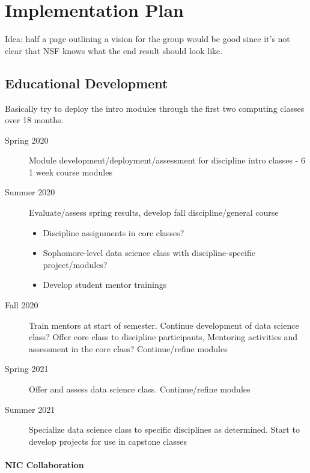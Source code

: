 \section{Implementation Plan}
Idea: half a page outlining a vision for the group would be good since it's not clear that NSF knows what the end result should look like.

\subsection{Educational Development}
Basically try to deploy the intro modules through the first two computing classes over 18 months.
\begin{description}
    \item[Spring 2020] Module development/deployment/assessment for discipline intro classes - 6 1 week course modules
    \item[Summer 2020] Evaluate/assess spring results, develop fall discipline/general course
    \begin{itemize}
        \item Discipline assignments in core classes?
        \item Sophomore-level data science class with discipline-specific project/modules?
        \item Develop student mentor trainings
    \end{itemize}
    \item[Fall 2020] Train mentors at start of semester. Continue development of data science class? Offer core class to discipline participants, Mentoring activities and assessment in the core class? Continue/refine modules
    \item[Spring 2021] Offer and assess data science class. Continue/refine modules
    \item[Summer 2021] Specialize data science class to specific disciplines as determined. Start to develop projects for use in capstone classes
\end{description}

\paragraph{NIC Collaboration}

